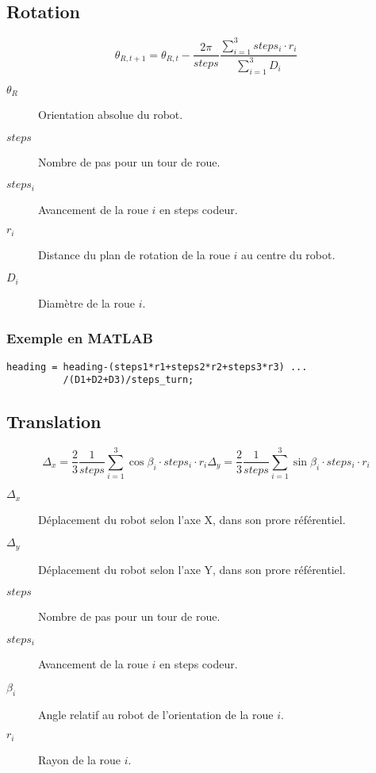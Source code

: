 \documentclass[a4paper]{paper}
\begin{document}
\subsection{Rotation}
\begin{equation}
    \theta_{R, t+1} = \theta_{R, t} - \frac{2\pi}{steps} \frac{\sum\limits_{i=1}^3 steps_i \cdot r_i}{\sum\limits_{i=1}^3 D_i}
    \label{eqn:reverse-heading}
\end{equation}
\begin{description}
    \item[$\theta_R$] Orientation absolue du robot.
    \item[$steps$] Nombre de pas pour un tour de roue.
    \item[$steps_i$] Avancement de la roue $i$ en steps codeur.
    \item[$r_i$] Distance du plan de rotation de la roue $i$ au centre du robot.
    \item[$D_i$] Diamètre de la roue $i$.
\end{description}

\subsubsection{Exemple en MATLAB}
\begin{lstlisting}
heading = heading-(steps1*r1+steps2*r2+steps3*r3) ...
          /(D1+D2+D3)/steps_turn;
\end{lstlisting}

\subsection{Translation}
\begin{subequations}
    \begin{equation}
    \Delta_x = \frac{2}{3} \frac{1}{steps} \sum\limits_{i=1}^3 \cos \beta_i \cdot steps_i \cdot r_i 
    \end{equation}
    \begin{equation}
    \Delta_y = \frac{2}{3} \frac{1}{steps} \sum\limits_{i=1}^3 \sin \beta_i \cdot steps_i \cdot r_i 
    \end{equation}

    \label{eqn:reverse-translation}
\end{subequations}
\begin{description}
    \item[$\Delta_x$] Déplacement du robot selon l'axe X, dans son prore référentiel.
    \item[$\Delta_y$] Déplacement du robot selon l'axe Y, dans son prore référentiel.
    \item[$steps$] Nombre de pas pour un tour de roue.
    \item[$steps_i$] Avancement de la roue $i$ en steps codeur.
    \item[$\beta_i$] Angle relatif au robot de l'orientation de la roue $i$.
    \item[$r_i$] Rayon de la roue $i$.
\end{description}
\end{document}
